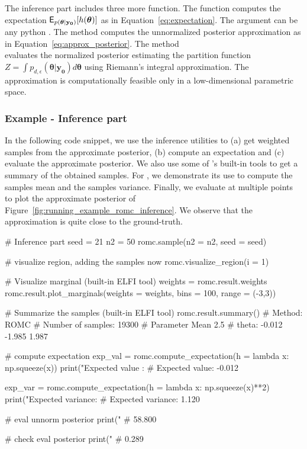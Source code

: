 \documentclass[article, shortnames]{jss}
\newcommand{\thetab}{\boldsymbol{\theta}}
\newcommand{\data}{\mathbf{y_0}}
\begin{document}
\noindent
The inference part includes three more function. The function
 computes the expectation
\(\E_{p(\thetab|\data)}[h(\thetab)]\) as in
Equation~\ref{eq:expectation}. The argument  can be any python
. The method  computes the unnormalized posterior
approximation as in Equation~\ref{eq:approx_posterior}. The method \\
 evaluates the
normalized posterior estimating the partition function
\(Z = \int p_{d,\epsilon}(\thetab|\data)d\thetab\) using Riemann's
integral approximation. The approximation is computationally feasible
only in a low-dimensional parametric space.

\subsubsection*{Example - Inference part}

In the following code snippet, we use the inference utilities to (a)
get weighted samples from the approximate posterior, (b) compute an
expectation and (c) evaluate the approximate posterior. We also use
some of 's built-in tools to get a summary of the obtained
samples. For , we demonstrate its use
to compute the samples mean and the samples variance. Finally, we
evaluate  at multiple points to plot the
approximate posterior of
Figure~\ref{fig:running_example_romc_inference}. We observe that the
approximation is quite close to the ground-truth.

\begin{Code}
# Inference part
seed = 21
n2 = 50
romc.sample(n2 = n2, seed = seed)

# visualize region, adding the samples now
romc.visualize_region(i = 1)

# Visualize marginal (built-in ELFI tool)
weights = romc.result.weights
romc.result.plot_marginals(weights = weights, bins = 100, range = (-3,3))

# Summarize the samples (built-in ELFI tool)
romc.result.summary()
# Method: ROMC
# Number of samples: 19300
# Parameter                Mean               2.5%
# theta:                 -0.012             -1.985              1.987

# compute expectation
exp_val = romc.compute_expectation(h = lambda x: np.squeeze(x))
print("Expected value   : %
# Expected value: -0.012

exp_var = romc.compute_expectation(h = lambda x: np.squeeze(x)**2)
print("Expected variance: %
# Expected variance: 1.120

# eval unnorm posterior
print("%
# 58.800

# check eval posterior
print("%
# 0.289
\end{Code}
\end{document}
